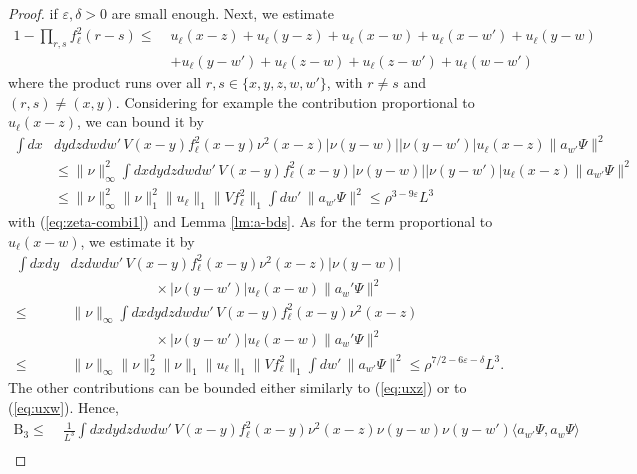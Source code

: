 \documentclass[a4paper,11pt]{article}
\def\eps{\varepsilon}
\numberwithin{equation}{section}
\begin{document}
\begin{proof}
if $\eps, \delta > 0$ are small enough. Next, we estimate 
\[ \begin{split}  1  - \prod_{r,s} f_\ell^2 (r-s) \leq \; &u_\ell (x-z) + u_\ell (y-z) + u_\ell (x-w) + u_\ell (x-w') +u_\ell (y-w) \\ &+ u_\ell (y-w') + u_\ell (z-w) + u_\ell (z-w') + u_\ell (w-w') \end{split} \]
where the product runs over all $r, s \in \{ x,y,z,w,w'\}$, with $r \not = s$ and $(r,s) \not = (x,y)$. Considering for example the contribution proportional to $u_\ell (x-z)$, we can bound it by 
\begin{equation} \label{eq:uxz} \begin{split}  \int dx &dy dz dw dw' \, V(x-y)f_\ell^2(x-y) \nu^2 (x-z) |\nu (y-w)| |\nu (y-w')| u_\ell (x-z) \| a_{w'} \Psi \|^2 \\  &\leq \| \nu \|_\infty^2 \int dx dy dz dw dw' \, V(x-y) f_\ell^2(x-y)|\nu (y-w)| |\nu (y-w')| u_\ell (x-z) \| a_{w'} \Psi \|^2 \\  &\leq \| \nu \|_\infty^2 \| \nu \|_1^2 \| u_\ell \|_1\|Vf_\ell^2\|_1 \int dw' \, \| a_{w'} \Psi \|^2 \leq  \rho^{3-9\eps}  L^3 \end{split} \end{equation}
with (\ref{eq:zeta-combi1}) and Lemma \ref{lm:a-bds}. As for the term proportional to $u_\ell (x-w)$, we estimate it by 
\begin{equation}\label{eq:uxw} \begin{split}  \int dx dy &dz dw dw' \, V(x-y) f_\ell^2(x-y) \nu^2 (x-z) |\nu (y-w)|\\
&\qquad\qquad\qquad\times|\nu (y-w')| u_\ell (x-w) \| a_w' \Psi \|^2 \\ 
\leq\;& \| \nu \|_\infty   \int dx dy dz dw dw' \, V(x-y)f_\ell^2(x-y) \nu^2 (x-z)\\
&\qquad\qquad\qquad\times|\nu (y-w')| u_\ell (x-w) \| a_w' \Psi \|^2 \\ \leq\;& \| \nu \|_\infty \| \nu \|_2^2 \| \nu \|_1 \| u_\ell \|_1\|Vf_\ell^2\|_1 \int dw' \, \| a_{w'} \Psi \|^2 \leq  \rho^{7/2-6\eps-\delta}  L^3. \end{split} \end{equation}
The other contributions can be bounded either similarly to (\ref{eq:uxz}) or to (\ref{eq:uxw}). Hence, 
\[\begin{split}
    \text{B}_3 \leq \;&\frac{1}{L^3} \int dx dy dz dw dw' \, V(x-y) f_\ell^2 (x-y)  \nu^2 (x-z) \nu (y-w) \nu (y-w')  \langle a_{w'} \Psi,  a_w \Psi \rangle  
\\

\end{split}\]
\end{proof}
\end{document}

